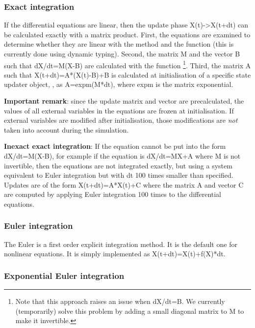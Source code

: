 \documentclass[letterpaper,10pt,english]{manual}
\begin{document}
\hypertarget{index-10}{}\subsubsection{Exact integration}

If the differential equations are linear, then the update phase
X(t)-\textgreater{}X(t+dt) can be calculated exactly with a matrix product.
First, the equations are examined to determine whether they are linear
with the method  and the function
 (this is currently done using dynamic typing).
Second, the matrix M and the vector B such that dX/dt=M(X-B) are calculated with
the function  \footnote{
Note that this approach raises an issue when dX/dt=B. We currently (temporarily)
solve this problem by adding a small diagonal matrix to M to make it invertible.
}.
Third, the matrix A such that X(t+dt)=A*(X(t)-B)+B is calculated at initialisation
of a specific state updater object, \hyperlink{brian.LinearStateUpdater}{},
as A=expm(M*dt), where expm is the matrix exponential.

\textbf{Important remark}: since the update matrix and vector are precalculated,
the values of all external variables in the equations are frozen at
initialisation. If external variables are modified after initialisation,
those modifications are \emph{not} taken into account during the simulation.

\textbf{Inexact exact integration}: If the equation cannot be put into the form dX/dt=M(X-B),
for example if the equation is dX/dt=MX+A where M is not invertible, then the equations
are not integrated exactly, but using a system equivalent to Euler integration but with
dt 100 times smaller than specified. Updates are of the form X(t+dt)=A*X(t)+C where the
matrix A and vector C are computed by applying Euler integration 100 times to the
differential equations.

\subsubsection{Euler integration}

The Euler is a first order explicit integration method. It is the default one for
nonlinear equations. It is simply implemented as X(t+dt)=X(t)+f(X)*dt.

\subsubsection{Exponential Euler integration}
\end{document}
